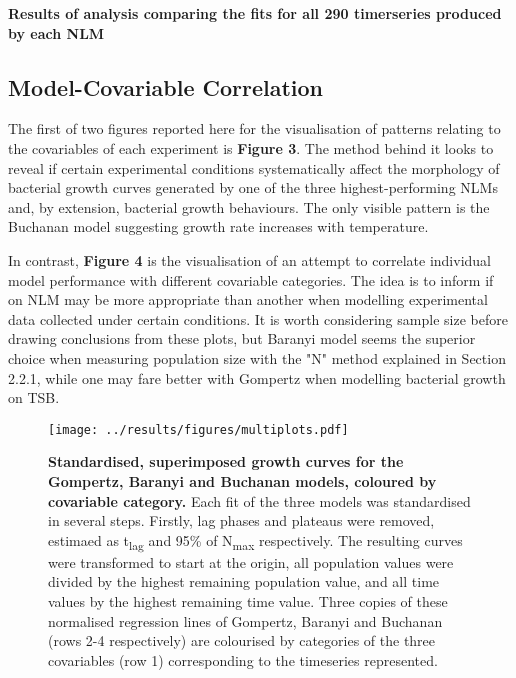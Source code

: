 \documentclass[11pt]{article}
\begin{document}
\begin{table}[htb]
    \centering
    \caption{\textbf{Results of analysis comparing the fits for all 290 timerseries produced by each NLM}}
\end{table}


\subsection{Model-Covariable Correlation}

The first of two figures reported here for the visualisation of patterns relating to the covariables of each experiment is \textbf{Figure 3}. The method behind it looks to reveal if certain experimental conditions systematically affect the morphology of bacterial growth curves generated by one of the three highest-performing NLMs and, by extension, bacterial growth behaviours. The only visible pattern is the Buchanan model suggesting growth rate increases with temperature.

In contrast, \textbf{Figure 4} is the visualisation of an attempt to correlate individual model performance with different covariable categories. The idea is to inform if on NLM may be more appropriate than another when modelling experimental data collected under certain conditions. It is worth considering sample size before drawing conclusions from these plots, but Baranyi model seems the superior choice when measuring population size with the "N" method explained in Section 2.2.1, while one may fare better with Gompertz when modelling bacterial growth on TSB.


\begin{figure*}
    \centering
    \texttt{[image: ../results/figures/multiplots.pdf]} %
    \caption{\textbf{Standardised, superimposed growth curves for the Gompertz, Baranyi and Buchanan models, coloured by covariable category.}  Each fit of the three models was standardised in several steps. Firstly, lag phases and plateaus were removed, estimaed as t\textsubscript{lag} and 95\% of N\textsubscript{max} respectively. The resulting curves were transformed to start at the origin, all population values were divided by the highest remaining population value, and all time values by the highest remaining time value. Three copies of these normalised regression lines of Gompertz, Baranyi and Buchanan (rows 2-4 respectively) are colourised by categories of the three covariables (row 1) corresponding to the timeseries represented.}
\end{figure*}
\end{document}
